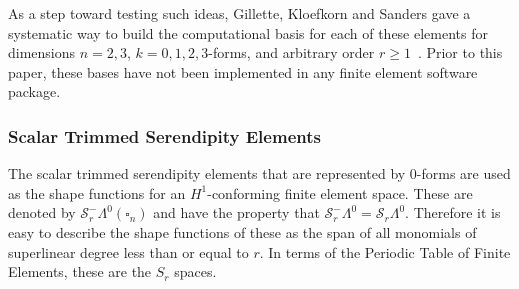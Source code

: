 \documentclass[manuscript,screen]{acmart}
\newcommand{\calS}{\mathcal{S}}
\begin{document}
  

  
    
	As a step toward testing such ideas, Gillette, Kloefkorn and Sanders gave a systematic way to build the computational basis for each of these elements for dimensions $n = 2, 3$, $k=0, 1, 2, 3$-forms, and arbitrary order $r \geq 1$~\cite{gillette2019computational}.
	Prior to this paper, these bases have not been implemented in any finite element software package.
  
  \subsubsection{Scalar Trimmed Serendipity Elements}
  The scalar trimmed serendipity elements that are represented by $0$-forms are used as the shape functions for an $H^1$-conforming finite element space.  These are denoted by $\calS_r^-\Lambda^0(\square_n)$ and have the property that $\calS_r^-\Lambda^0 = \calS_r\Lambda^0$.  Therefore it is easy to describe the shape functions of these as the span of all monomials of superlinear degree less than or equal to $r$. In terms of the Periodic Table of Finite Elements, these are the $S_r$ spaces. 
  
\end{document}
